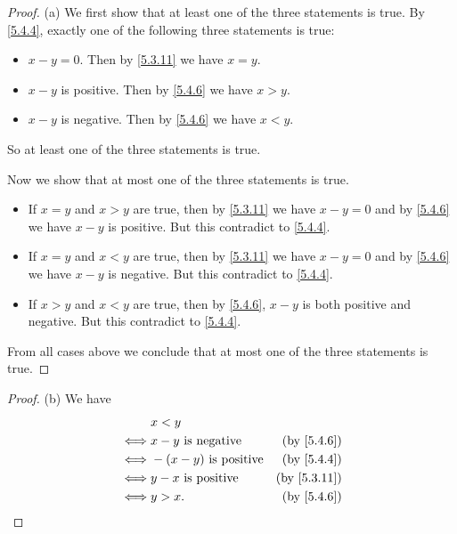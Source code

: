 \begin{proof}{(a)}
  We first show that at least one of the three statements is true.
  By \cref{5.4.4}, exactly one of the following three statements is true:
  \begin{itemize}
    \item \(x - y = 0\).
          Then by \cref{5.3.11} we have \(x = y\).
    \item \(x - y\) is positive.
          Then by \cref{5.4.6} we have \(x > y\).
    \item \(x - y\) is negative.
          Then by \cref{5.4.6} we have \(x < y\).
  \end{itemize}
  So at least one of the three statements is true.

  Now we show that at most one of the three statements is true.
  \begin{itemize}
    \item If \(x = y\) and \(x > y\) are true, then by \cref{5.3.11} we have \(x - y = 0\) and by \cref{5.4.6} we have \(x - y\) is positive.
          But this contradict to \cref{5.4.4}.
    \item If \(x = y\) and \(x < y\) are true, then by \cref{5.3.11} we have \(x - y = 0\) and by \cref{5.4.6} we have \(x - y\) is negative.
          But this contradict to \cref{5.4.4}.
    \item If \(x > y\) and \(x < y\) are true, then by \cref{5.4.6}, \(x - y\) is both positive and negative.
          But this contradict to \cref{5.4.4}.
  \end{itemize}
  From all cases above we conclude that at most one of the three statements is true.
\end{proof}

\begin{proof}{(b)}
  We have
  \begin{align*}
         & x < y                                                    \\
    \iff & x - y \text{ is negative}    & \text{(by \cref{5.4.6})}  \\
    \iff & -(x - y) \text{ is positive} & \text{(by \cref{5.4.4})}  \\
    \iff & y - x \text{ is positive}    & \text{(by \cref{5.3.11})} \\
    \iff & y > x.                       & \text{(by \cref{5.4.6})}
  \end{align*}
\end{proof}

